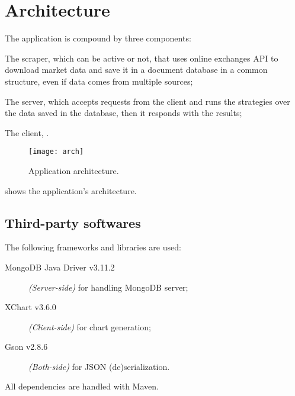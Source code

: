 \chapter{Architecture}\label{ch:arch}

The application is compound by three components:
\begin{enumerate*}[label=(\roman*)]
	\item The scraper, which can be active or not, that uses online
		exchanges API to download market data and save it in a document
		database in a common structure, even if data comes from multiple
		sources;
	\item The server, which accepts requests from the client and runs the
		strategies over the data saved in the database, then it responds
		with the results;
	\item The client, .
\end{enumerate*}

\begin{figure}[p]
	\texttt{[image: arch]}
	\caption{Application architecture.}
	\label{fig:arch}
\end{figure}

 shows the application's architecture.

\section{Third-party softwares}\label{sec:thirdparty}

The following frameworks and libraries are used:
\begin{description}
	\item[MongoDB Java Driver v3.11.2] \textit{(Server-side)} for handling
		MongoDB server;
	\item[XChart v3.6.0] \textit{(Client-side)} for chart generation;
	\item[Gson v2.8.6] \textit{(Both-side)} for JSON (de)serialization.
\end{description}

All dependencies are handled with Maven.
